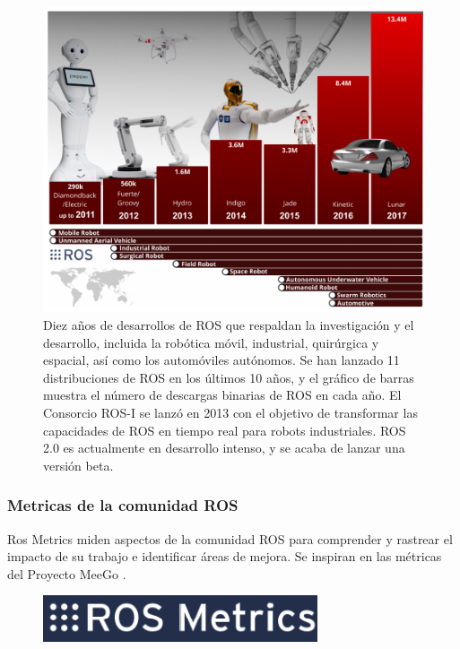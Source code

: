             \begin{figure}[htb]
                \centering
                \includegraphics[width=1.0\linewidth]{Main/Chapter3/Images3/science_robot_esta_2.png}
                \caption{Diez años de desarrollos de ROS que respaldan la investigación y el desarrollo, incluida la robótica móvil, industrial, quirúrgica y espacial, así como los automóviles autónomos. Se han lanzado 11 distribuciones de ROS en los últimos 10 años, y el gráfico de barras muestra el número de descargas binarias de ROS en cada año. El Consorcio ROS-I se lanzó en 2013 con el objetivo de transformar las capacidades de ROS en tiempo real para robots industriales. ROS 2.0 es actualmente en desarrollo intenso, y se acaba de lanzar una versión beta.}
                \label{f:Cap3-5_estadisticas_2}
            \end{figure}  


         \newpage
    
        \subsubsection{Metricas de la comunidad ROS}
    
    Ros Metrics miden aspectos de la comunidad ROS para comprender y rastrear el impacto de su trabajo e identificar áreas de mejora. Se inspiran en las métricas del Proyecto MeeGo .
    
        \begin{figure}[htb]
            \centering
            \includegraphics[width=0.4\linewidth]{Main/Chapter3/Images3/cap3_estadisticas_3.png}
            \caption{}
            \label{f:Cap3-5_estadisticas_3}
        \end{figure}  
        
